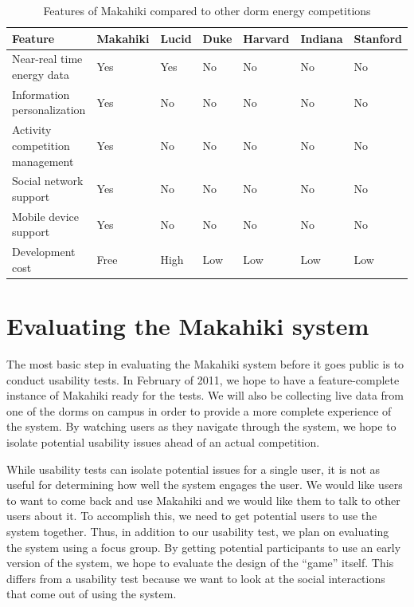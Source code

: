 \begin{table}[h]
	\begin{tabular}{| l || l | l | l | l | l | l | }
		\hline
		Feature & Makahiki & Lucid & Duke & Harvard & Indiana & Stanford \\
		\hline
		Near-real time energy data & Yes & Yes & No & No & No & No \\
		Information personalization & Yes & No & No & No & No & No \\
		Activity competition management & Yes & No & No & No & No & No\\
		Social network support & Yes & No & No & No & No & No\\
		Mobile device support & Yes & No & No & No & No & No \\
		Development cost & Free & High & Low & Low & Low & Low \\
		\hline
	\end{tabular}
	\caption{Features of Makahiki compared to other dorm energy competitions}
	\label{feature-comparison}
\end{table}

\section{Evaluating the Makahiki system}

The most basic step in evaluating the Makahiki system before it goes public is to conduct usability tests.  In February of 2011, we hope to have a feature-complete instance of Makahiki ready for the tests.  We will also be collecting live data from one of the dorms on campus in order to provide a more complete experience of the system.  By watching users as they navigate through the system, we hope to isolate potential usability issues ahead of an actual competition.

While usability tests can isolate potential issues for a single user, it is not as useful for determining how well the system engages the user.  We would like users to want to come back and use Makahiki and we would like them to talk to other users about it. To accomplish this, we need to get potential users to use the system together.  Thus, in addition to our usability test, we plan on evaluating the system using a focus group.  By getting potential participants to use an early version of the system, we hope to evaluate the design of the ``game'' itself.  This differs from a usability test because we want to look at the social interactions that come out of using the system.

